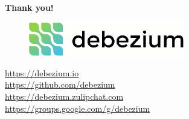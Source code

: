 \documentclass[10pt,utf8]{beamer}
\begin{document}
\begin{frame}
    \centering
    \textbf{\Huge{Thank you!}}
    
    \vspace{1cm}
    
    \begin{figure}
        \centering
        \includegraphics[height=1.5cm]{./img/debezium.eps}
    \end{figure}
    
    \vspace{0.5cm}
    
    \centering
    \color{blue}
    \url{https://debezium.io}\\
    \url{https://github.com/debezium}\\
    \url{https://debezium.zulipchat.com}\\
    \url{https://groups.google.com/g/debezium}\\
    \color{black}
\end{frame}


\end{document}
